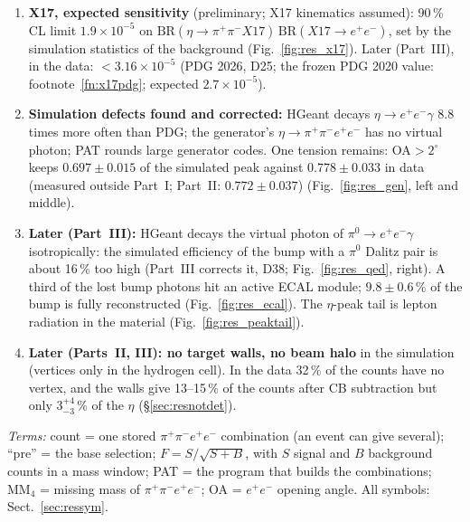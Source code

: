\documentclass[11pt,a4paper]{article}
\newcommand{\pip}{\ensuremath{\pi^{+}}\xspace}
\newcommand{\pim}{\ensuremath{\pi^{-}}\xspace}
\newcommand{\piz}{\ensuremath{\pi^{0}}\xspace}
\newcommand{\ee}{\ensuremath{e^{+}e^{-}}\xspace}
\newcommand{\pipi}{\ensuremath{\pi^{+}\pi^{-}}\xspace}
\newcommand{\ppee}{\ensuremath{\pi^{+}\pi^{-}e^{+}e^{-}}\xspace}
\begin{document}
{{\begin{enumerate}
      $\pm$4.5--5\,\% (bump) (Fig.~\ref{fig:res_bias}). Later finding (Part~III): with realistic template noise every
      template fit comes out about 10\,\% low; the leak-corrected peak side bands are unbiased, and the bump is measured
      through its edge step (Fig.~\ref{fig:res_stress}), also in $u$, the distance to the edge, below which every
      simulated bump count lies (Fig.~\ref{fig:res_edgeu}; 0.426 of SMASH, Part~III's bump measurement, D37).
\item \textbf{X17, expected sensitivity} (preliminary; X17 kinematics assumed): 90\,\% CL limit $1.9\times10^{-5}$ on
      $\mathrm{BR}(\eta\to\pipi X17)\,\mathrm{BR}(X17\to\ee)$, set by the simulation statistics of the background
      (Fig.~\ref{fig:res_x17}). Later (Part~III), in the data: $<3.16\times10^{-5}$ (PDG 2026, D25; the frozen
      PDG 2020 value: footnote~\ref{fn:x17pdg}; expected $2.7\times10^{-5}$).
\item \textbf{Simulation defects found and corrected:} HGeant decays $\eta\to\ee\gamma$ 8.8 times more often than PDG;
      the generator's $\eta\to\ppee$ has no virtual photon; PAT rounds large generator codes. One tension remains:
      OA$>2^\circ$ keeps $0.697\pm0.015$ of the simulated peak against $0.778\pm0.033$ in data (measured outside Part~I;
      Part~II: $0.772\pm0.037$) (Fig.~\ref{fig:res_gen}, left and middle).
\item \textbf{Later (Part~III):} HGeant decays the virtual photon of $\piz\to\ee\gamma$ isotropically: the
      simulated efficiency of the bump with a \piz Dalitz pair is about 16\,\% too high (Part~III corrects it, D38;
      Fig.~\ref{fig:res_qed}, right). A third of the lost bump photons hit an active ECAL module; $9.8\pm0.6$\,\% of the
      bump is fully reconstructed (Fig.~\ref{fig:res_ecal}). The $\eta$-peak tail is lepton radiation in the
      material (Fig.~\ref{fig:res_peaktail}).
\item \textbf{Later (Parts~II, III): no target walls, no beam halo} in the simulation (vertices only in the hydrogen cell).
      In the data 32\,\% of the counts have no vertex, and the walls give 13--15\,\% of the counts after CB subtraction but only
      $3^{+4}_{-3}$\,\% of the $\eta$ (\S\ref{sec:resnotdet}).
\end{enumerate}}
{\footnotesize\textit{Terms:} count = one stored \pip\pim$e^+e^-$ combination (an event can give several); ``pre'' = the
base selection; $F = S/\sqrt{S+B}$, with $S$ signal and $B$ background counts in a mass window; PAT = the program that
builds the combinations; $\mathrm{MM}_4$ = missing mass of \ppee; OA = \ee opening angle. All symbols:
Sect.~\ref{sec:ressym}.\par}}
\end{document}
